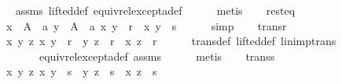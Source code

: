 \begin{isabellebody}
\ \ \ \ \isamarkupfalse%
\ assms\ lifted{\isacharunderscore}{\kern0pt}def\ equiv{\isacharunderscore}{\kern0pt}rel{\isacharunderscore}{\kern0pt}except{\isacharunderscore}{\kern0pt}a{\isacharunderscore}{\kern0pt}def\isanewline
\ \ \ \ \isamarkupfalse%
\ metis\isanewline
\ \ \isamarkupfalse%
\ rest{\isacharunderscore}{\kern0pt}eq{\isacharcolon}{\kern0pt}\isanewline
\ \ \ \ {\isachardoublequoteopen}{\isasymforall}x\ {\isasymin}\ A\ {\isacharminus}{\kern0pt}\ {\isacharbraceleft}{\kern0pt}a{\isacharbraceright}{\kern0pt}{\isachardot}{\kern0pt}\ {\isasymforall}y\ {\isasymin}\ A\ {\isacharminus}{\kern0pt}\ {\isacharbraceleft}{\kern0pt}a{\isacharbraceright}{\kern0pt}{\isachardot}{\kern0pt}\ {\isacharparenleft}{\kern0pt}x{\isacharcomma}{\kern0pt}\ y{\isacharparenright}{\kern0pt}\ {\isasymin}\ r\ {\isasymlongleftrightarrow}\ {\isacharparenleft}{\kern0pt}x{\isacharcomma}{\kern0pt}\ y{\isacharparenright}{\kern0pt}\ {\isasymin}\ s{\isachardoublequoteclose}\isanewline
\ \ \ \ \isamarkupfalse%
\ simp\isanewline
\ \ \isamarkupfalse%
\ trans{\isacharunderscore}{\kern0pt}r{\isacharcolon}{\kern0pt}\isanewline
\ \ \ \ {\isachardoublequoteopen}{\isasymforall}x\ y\ z{\isachardot}{\kern0pt}\ {\isacharparenleft}{\kern0pt}x{\isacharcomma}{\kern0pt}\ y{\isacharparenright}{\kern0pt}\ {\isasymin}\ r\ {\isasymlongrightarrow}\ {\isacharparenleft}{\kern0pt}y{\isacharcomma}{\kern0pt}\ z{\isacharparenright}{\kern0pt}\ {\isasymin}\ r\ {\isasymlongrightarrow}\ {\isacharparenleft}{\kern0pt}x{\isacharcomma}{\kern0pt}\ z{\isacharparenright}{\kern0pt}\ {\isasymin}\ r{\isachardoublequoteclose}\isanewline
\ \ \ \ \isamarkupfalse%
\ trans{\isacharunderscore}{\kern0pt}def\ lifted{\isacharunderscore}{\kern0pt}def\ lin{\isacharunderscore}{\kern0pt}imp{\isacharunderscore}{\kern0pt}trans\isanewline
\ \ \ \ \ \ \ \ \ \ equiv{\isacharunderscore}{\kern0pt}rel{\isacharunderscore}{\kern0pt}except{\isacharunderscore}{\kern0pt}a{\isacharunderscore}{\kern0pt}def\ assms\isanewline
\ \ \ \ \isamarkupfalse%
\ metis\isanewline
\ \ \isamarkupfalse%
\ trans{\isacharunderscore}{\kern0pt}s{\isacharcolon}{\kern0pt}\isanewline
\ \ \ \ {\isachardoublequoteopen}{\isasymforall}x\ y\ z{\isachardot}{\kern0pt}\ {\isacharparenleft}{\kern0pt}x{\isacharcomma}{\kern0pt}\ y{\isacharparenright}{\kern0pt}\ {\isasymin}\ s\ {\isasymlongrightarrow}\ {\isacharparenleft}{\kern0pt}y{\isacharcomma}{\kern0pt}\ z{\isacharparenright}{\kern0pt}\ {\isasymin}\ s\ {\isasymlongrightarrow}\ {\isacharparenleft}{\kern0pt}x{\isacharcomma}{\kern0pt}\ z{\isacharparenright}{\kern0pt}\ {\isasymin}\ s{\isachardoublequoteclose}\isanewline

\end{isabellebody}
